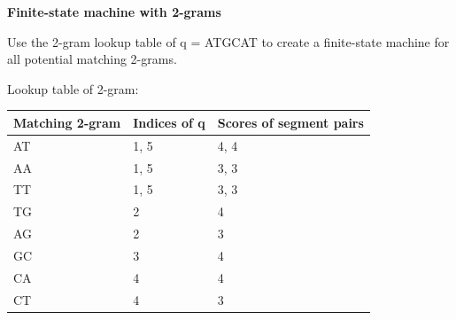 \question \textbf{Finite-state machine with 2-grams}
  
Use the 2-gram lookup table of q = ATGCAT to create a finite-state machine for all potential matching 2-grams.

\vspace{0.1 in}

Lookup table of 2-gram:
\begin{table}[h]
\centering
\begin{tabular}{|l|l|l|}
\hline
\textbf{Matching 2-gram} & \textbf{Indices of q} & \textbf{Scores of segment pairs} \\ \hline
AT                       & 1, 5                  & 4, 4                             \\ \hline
AA                       & 1, 5                  & 3, 3                             \\ \hline
TT                       & 1, 5                  & 3, 3                             \\ \hline
TG                       & 2                     & 4                                \\ \hline
AG                       & 2                     & 3                                \\ \hline
GC                       & 3                     & 4                                \\ \hline
CA                       & 4                     & 4                                \\ \hline
CT                       & 4                     & 3                                \\ \hline
\end{tabular}
\end{table}

\vspace{0.1 in}

